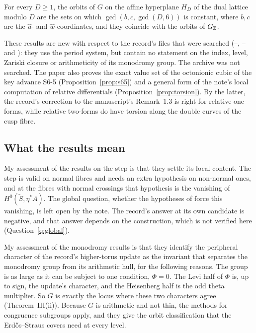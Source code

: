 \begin{introthm}
For every $D\ge1$, the orbits of $G$ on the affine hyperplane $H_D$ of the dual lattice modulo $D$ are the sets on which $\gcd(b,c,\gcd(D,6))$ is constant, where $b,c$ are the $\hat u$- and $\hat w$-coordinates, and they coincide with the orbits of $G_{\mathbb{Z}}$.
\end{introthm}

These results are new with respect to the record's files that were searched (--, -- and ): they use the period system, but contain no statement on the index, level, Zariski closure or arithmeticity of its monodromy group. The archive  was not searched. The paper also proves the exact value set of the octonionic cubic of the key advance S6-5 (Proposition~\ref{prop:s65}) and a general form of the note's local computation of relative differentials (Proposition~\ref{prop:torsion}). By the latter, the record's correction to the manuscript's Remark~1.3 is right for relative one-forms, while relative two-forms do have torsion along the double curves of the cusp fibre.

\subsection*{What the results mean}

My assessment of the results on the step is that they settle its local content. The step is valid on normal fibres and needs an extra hypothesis on non-normal ones, and at the fibres with normal crossings that hypothesis is the vanishing of $H^0(\tilde S,\eta^*A)$. The global question, whether the hypotheses of \cite{CDP20} force this vanishing, is left open by the note. The record's answer at its own candidate is negative, and that answer depends on the construction, which is not verified here (Question~\ref{q:global}).

My assessment of the monodromy results is that they identify the peripheral character of the record's higher-torus update as the invariant that separates the monodromy group from its arithmetic hull, for the following reasons. The group is as large as it can be subject to one condition, $\Phi=0$. The Levi half of $\Phi$ is, up to sign, the update's character, and the Heisenberg half is the odd theta multiplier. So $G$ is exactly the locus where these two characters agree (Theorem~III(ii)). Because $G$ is arithmetic and not thin, the methods for congruence subgroups apply, and they give the orbit classification that the Erdős--Straus covers need at every level.

